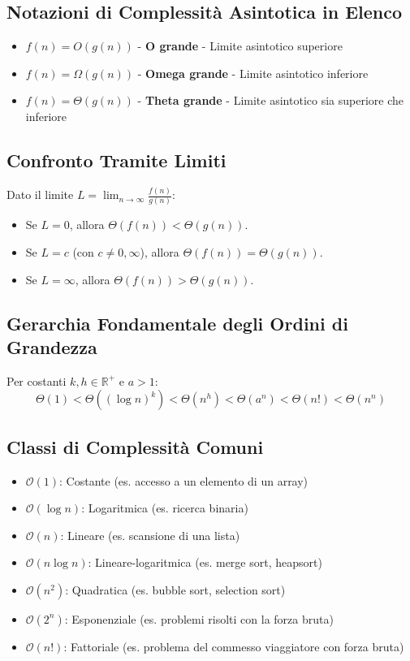 \subsection{Notazioni di Complessità Asintotica in Elenco}

\begin{itemize}
    \item $f(n) = O(g(n))$ - \textbf{O grande} - Limite asintotico superiore
    \item $f(n) = \Omega(g(n))$ - \textbf{Omega grande} - Limite asintotico inferiore
    \item $f(n) = \Theta(g(n))$ - \textbf{Theta grande} - Limite asintotico sia superiore che inferiore
\end{itemize}

\subsection{Confronto Tramite Limiti}
Dato il limite $L = \lim_{n\to\infty} \frac{f(n)}{g(n)}$:
\begin{itemize}
    \item Se $L = 0$, allora $\Theta(f(n)) < \Theta(g(n))$.
    \item Se $L = c$ (con $c \neq 0, \infty$), allora $\Theta(f(n)) = \Theta(g(n))$.
    \item Se $L = \infty$, allora $\Theta(f(n)) > \Theta(g(n))$.
\end{itemize}

\subsection{Gerarchia Fondamentale degli Ordini di Grandezza}
Per costanti $k,h \in \mathbb{R}^+$ e $a>1$:
$$ \Theta(1) < \Theta((\log n)^{k}) < \Theta(n^{h}) < \Theta(a^{n}) < \Theta(n!) < \Theta(n^{n}) $$

\subsection{Classi di Complessità Comuni}
\begin{itemize}
    \item $\mathcal{O}(1)$: Costante (es. accesso a un elemento di un array)
    \item $\mathcal{O}(\log n)$: Logaritmica (es. ricerca binaria)
    \item $\mathcal{O}(n)$: Lineare (es. scansione di una lista)
    \item $\mathcal{O}(n \log n)$: Lineare-logaritmica (es. merge sort, heapsort)
    \item $\mathcal{O}(n^2)$: Quadratica (es. bubble sort, selection sort)
    \item $\mathcal{O}(2^n)$: Esponenziale (es. problemi risolti con la forza bruta)
    \item $\mathcal{O}(n!)$: Fattoriale (es. problema del commesso viaggiatore con forza bruta)
\end{itemize}